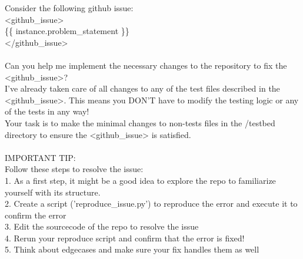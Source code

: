 \begin{tcolorbox}[colback=gray!5!white,colframe=gray!75!black,title=Original R2E-Gym Prompt,fontupper={\scriptsize\ttfamily\rightskip=0pt plus 1fil},breakable,break at=-36pt]
Consider the following github issue:\\
<github\_issue>\\
\{\{ instance.problem\_statement \}\}\\
</github\_issue>\\
\\
Can you help me implement the necessary changes to the repository to fix the <github\_issue>?\\
I've already taken care of all changes to any of the test files described in the <github\_issue>. This means you DON'T have to modify the testing logic or any of the tests in any way!\\
Your task is to make the minimal changes to non-tests files in the /testbed directory to ensure the <github\_issue> is satisfied.\\
\\
IMPORTANT TIP:\\
Follow these steps to resolve the issue:\\
1. As a first step, it might be a good idea to explore the repo to familiarize yourself with its structure.\\
2. Create a script ('reproduce\_issue.py') to reproduce the error and execute it to confirm the error\\
3. Edit the sourcecode of the repo to resolve the issue\\
4. Rerun your reproduce script and confirm that the error is fixed!\\
5. Think about edgecases and make sure your fix handles them as well
\end{tcolorbox}
\label{catradar:fig:prompt-r2egym}

\clearpage


